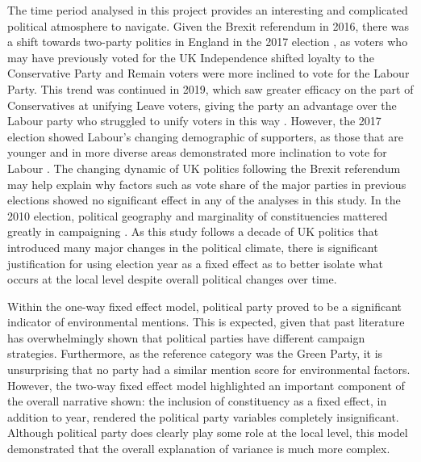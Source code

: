 \documentclass[preprint]{elsarticle} %
\begin{document}
The time period analysed in this project provides an interesting and complicated political atmosphere to navigate. Given the Brexit referendum in 2016, there was a shift towards two-party politics in England in the 2017 election \citep{hoboltBrexit2017UK2018,prosserStrangeDeathMultiparty2018}, as voters who may have previously voted for the UK Independence shifted loyalty to the Conservative Party and Remain voters were more inclined to vote for the Labour Party. This trend was continued in 2019, which saw greater efficacy on the part of Conservatives at unifying Leave voters, giving the party an advantage over the Labour party who struggled to unify voters in this way \citep{cuttsBrexit2019General2020}. However, the 2017 election showed Labour's changing demographic of supporters, as those that are younger and in more diverse areas demonstrated more inclination to vote for Labour \citep{heath2017GeneralElection2017}. The changing dynamic of UK politics following the Brexit referendum may help explain why factors such as vote share of the major parties in previous elections showed no significant effect in any of the analyses in this study. In the 2010 election, political geography and marginality of constituencies mattered greatly in campaigning \citep{johnstonLearningElectoralGeography2013}. As this study follows a decade of UK politics that introduced many major changes in the political climate, there is significant justification for using election year as a fixed effect as to better isolate what occurs at the local level despite overall political changes over time.

Within the one-way fixed effect model, political party proved to be a significant indicator of environmental mentions. This is expected, given that past literature has overwhelmingly shown that political parties have different campaign strategies. Furthermore, as the reference category was the Green Party, it is unsurprising that no party had a similar mention score for environmental factors. However, the two-way fixed effect model highlighted an important component of the overall narrative shown: the inclusion of constituency as a fixed effect, in addition to year, rendered the political party variables completely insignificant. Although political party does clearly play some role at the local level, this model demonstrated that the overall explanation of variance is much more complex.
\end{document}
